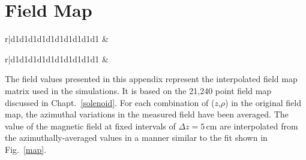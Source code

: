 \cleardoublepage
\chapter{Field Map}
\label{field_map_data}
\renewcommand{\arraystretch}{0.8} %
\renewcommand{\tabcolsep}{1.9mm} %
\begin{table}[ht]
\centering
\begin{tabular}{r|d{1}d{1}d{1}d{1}d{1}d{1}d{1}d{1}d{1}d{1}}
\hline
{} &\\ %
%
\end{tabular}
\caption{Average axial field strength $\mathscr{B}_z$ of the HELIOS solenoid in gauss. }
\label{axial_field}
\end{table}

\begin{table}[t]
\centering
\begin{tabular}{r|d{1}d{1}d{1}d{1}d{1}d{1}d{1}d{1}d{1}d{1}}
\hline
{} &\\ %
%
\end{tabular}
\caption{Average radial field strength $\mathscr{B}_\rho$ of the HELIOS solenoid in gauss.}
\label{radial_field}
\end{table}

The field values presented in this appendix represent the interpolated field map matrix used in the simulations.  It is based on the 21,240 point field map discussed in Chapt.~\ref{solenoid}.  For each combination of ($z$,$\rho$) in the original field map, the azimuthal variations in the measured field have been averaged.  The value of the magnetic field at fixed intervals of $\Delta z=5$\,cm are interpolated from the azimuthally-averaged values in a manner similar to the fit shown in Fig.~\ref{map}.

